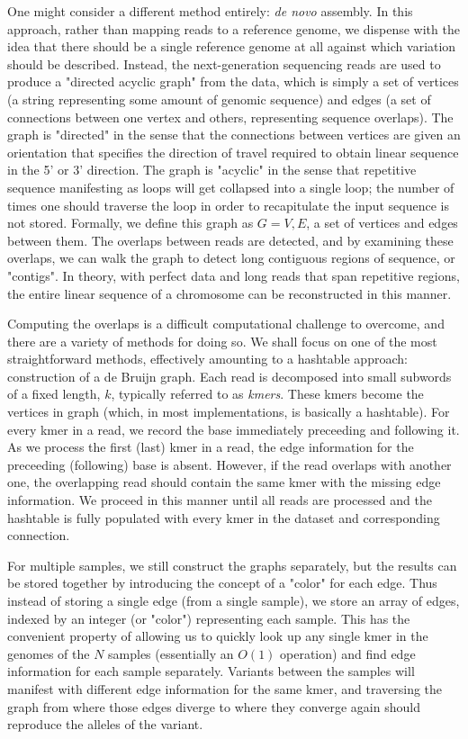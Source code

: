 One might consider a different method entirely: \textit{de novo} assembly.  In this approach, rather than mapping reads to a reference genome, we dispense with the idea that there should be a single reference genome at all against which variation should be described.  Instead, the next-generation sequencing reads are used to produce a "directed acyclic graph" from the data, which is simply a set of vertices (a string representing some amount of genomic sequence) and edges (a set of connections between one vertex and others, representing sequence overlaps).  The graph is "directed" in the sense that the connections between vertices are given an orientation that specifies the direction of travel required to obtain linear sequence in the 5' or 3' direction.  The graph is "acyclic" in the sense that repetitive sequence manifesting as loops will get collapsed into a single loop; the number of times one should traverse the loop in order to recapitulate the input sequence is not stored.  Formally, we define this graph as $G = {V, E}$, a set of vertices and edges between them.  The overlaps between reads are detected, and by examining these overlaps, we can walk the graph to detect long contiguous regions of sequence, or "contigs".  In theory, with perfect data and long reads that span repetitive regions, the entire linear sequence of a chromosome can be reconstructed in this manner.

Computing the overlaps is a difficult computational challenge to overcome, and there are a variety of methods for doing so.  We shall focus on one of the most straightforward methods, effectively amounting to a hashtable approach: construction of a de Bruijn graph.  Each read is decomposed into small subwords of a fixed length, $k$, typically referred to as \textit{kmers}.  These kmers become the vertices in graph (which, in most implementations, is basically a hashtable).  For every kmer in a read, we record the base immediately preceeding and following it.  As we process the first (last) kmer in a read, the edge information for the preceeding (following) base is absent.  However, if the read overlaps with another one, the overlapping read should contain the same kmer with the missing edge information.  We proceed in this manner until all reads are processed and the hashtable is fully populated with every kmer in the dataset and corresponding connection.

For multiple samples, we still construct the graphs separately, but the results can be stored together by introducing the concept of a "color" for each edge.  Thus instead of storing a single edge (from a single sample), we store an array of edges, indexed by an integer (or "color") representing each sample.  This has the convenient property of allowing us to quickly look up any single kmer in the genomes of the $N$ samples (essentially an $O(1)$ operation) and find edge information for each sample separately.  Variants between the samples will manifest with different edge information for the same kmer, and traversing the graph from where those edges diverge to where they converge again should reproduce the alleles of the variant.

